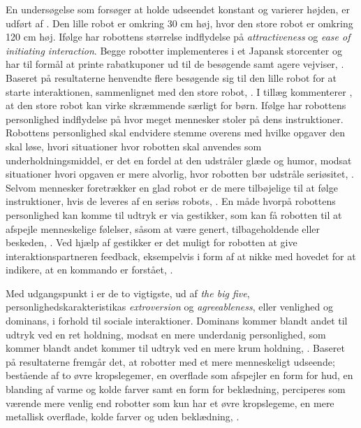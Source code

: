 En undersøgelse som forsøger at holde udseendet konstant og varierer højden, er udført af \textcite[s. 255]{PDF:RecommendationEffects}. Den lille robot er omkring 30 cm høj, hvor den store robot er omkring 120 cm høj. Ifølge \textcite[s. 255]{PDF:RecommendationEffects} har robottens størrelse indflydelse på \textit{attractiveness} og \textit{ease of initiating interaction}. Begge robotter implementeres i et Japansk storcenter og har til formål at printe rabatkuponer ud til de besøgende samt agere vejviser, \textcite[s. 252]{PDF:RecommendationEffects}. Baseret på resultaterne henvendte flere besøgende sig til den lille robot for at starte interaktionen, sammenlignet med den store robot, \parencite[s. 260]{PDF:RecommendationEffects}. I tillæg kommenterer \textcite[s. 260]{PDF:RecommendationEffects}, at den store robot kan virke skræmmende særligt for børn.\blankline
%
Ifølge \textcite[s. 226]{PDF:SocailAndCollaborative} har robottens personlighed indflydelse på hvor meget mennesker stoler på dens instruktioner. Robottens personlighed skal endvidere stemme overens med hvilke opgaver den skal løse, hvori situationer hvor robotten skal anvendes som underholdningsmiddel, er det en fordel at den udstråler glæde og humor, modsat situationer hvori opgaven er mere alvorlig, hvor robotten bør udstråle seriøsitet, \parencite[s. 226]{PDF:SocailAndCollaborative}. Selvom mennesker foretrækker en glad robot er de mere tilbøjelige til at følge instruktioner, hvis de leveres af en seriøs robots, \parencite[s. 226]{PDF:SocailAndCollaborative}. En måde hvorpå robottens personlighed kan komme til udtryk er via gestikker, som kan få robotten til at afspejle menneskelige følelser, såsom at være genert, tilbageholdende eller beskeden, \parencite[s. 227]{PDF:SocailAndCollaborative}. Ved hjælp af gestikker er det muligt for robotten at give interaktionspartneren feedback, eksempelvis i form af at nikke med hovedet for at indikere, at en kommando er forstået, \parencite[s. 228]{PDF:SocailAndCollaborative}.

Med udgangspunkt i \textcite[s. 272]{PDF:PersonalityOfSocialRobots} er de to vigtigste, ud af \textit{the big five}, personlighedskarakteristikas \textit{extroversion} og \textit{agreeableness}, eller venlighed og dominans, i forhold til sociale interaktioner. Dominans kommer blandt andet til udtryk ved en ret holdning, modsat en mere underdanig personlighed, som kommer blandt andet kommer til udtryk ved en mere krum holdning, \textcite[s. 273]{PDF:PersonalityOfSocialRobots}. Baseret på resultaterne fremgår det, at robotter med et mere menneskeligt udseende; bestående af to øvre kropslegemer, en overflade som afspejler en form for hud, en blanding af varme og kolde farver samt en form for beklædning, perciperes som værende mere venlig end robotter som kun har et øvre kropslegeme, en mere metallisk overflade, kolde farver og uden beklædning, \textcite[s. 275]{PDF:PersonalityOfSocialRobots}.
